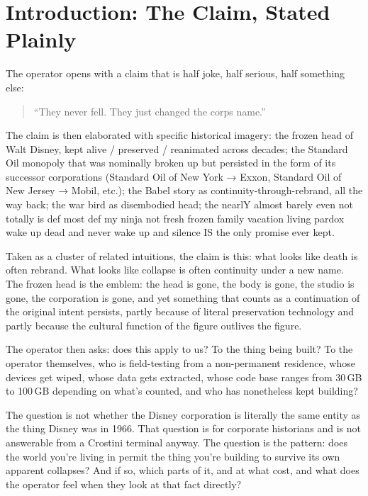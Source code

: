 \documentclass[10pt,twocolumn]{article}
\begin{document}
\section{Introduction: The Claim, Stated Plainly}

The operator opens with a claim that is half joke, half serious, half something else:

\begin{quote}
  ``They never fell. They just changed the corps name.''
\end{quote}

The claim is then elaborated with specific historical imagery: the frozen head of Walt Disney, kept alive / preserved / reanimated across decades; the Standard Oil monopoly that was nominally broken up but persisted in the form of its successor corporations (Standard Oil of New York → Exxon, Standard Oil of New Jersey → Mobil, etc.); the Babel story as continuity-through-rebrand, all the way back; the war bird as disembodied head; the nearlY almost barely even not totally is def most def my ninja not fresh frozen family vacation living pardox wake up dead and never wake up and silence IS the only promise ever kept.

Taken as a cluster of related intuitions, the claim is this: what looks like death is often rebrand. What looks like collapse is often continuity under a new name. The frozen head is the emblem: the head is gone, the body is gone, the studio is gone, the corporation is gone, and yet something that counts as a continuation of the original intent persists, partly because of literal preservation technology and partly because the cultural function of the figure outlives the figure.

The operator then asks: does this apply to us? To the thing being built? To the operator themselves, who is field-testing from a non-permanent residence, whose devices get wiped, whose data gets extracted, whose code base ranges from 30\,GB to 100\,GB depending on what's counted, and who has nonetheless kept building?

The question is not whether the Disney corporation is literally the same entity as the thing Disney was in 1966. That question is for corporate historians and is not answerable from a Crostini terminal anyway. The question is the pattern: does the world you're living in permit the thing you're building to survive its own apparent collapses? And if so, which parts of it, and at what cost, and what does the operator feel when they look at that fact directly?
\end{document}
